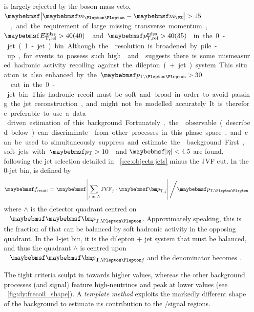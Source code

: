 \DYll is largely rejected by the \PZ boson mass veto, 
\unit{$\mods{\mll - \mZ} > 15$}{\GeV}, and the requirement of large missing transverse 
momentum, \unit{$\metrel > 40 (40)$}{\GeV} and \unit{$\trackmetrel > 40 (35)$}{\GeV} in 
the 0-jet (1-jet) bin. Although the \met resolution is broadened by pile-up, for 
events to possess such high \metrel and \trackmetrel suggests there is some mismeasured 
hadronic activity recoiling against the dilepton (+ jet) system. This situation is also 
enhanced by the \unit{$\ptll > 30$}{\GeV} cut in the 0-jet bin.

This hadronic recoil must be soft and broad in order to avoid passing the jet 
reconstruction, and might not be modelled accurately. It is therefore preferable to use 
a data-driven estimation of this background. Fortunately, the \frecoil observable 
(described below) can discriminate \DYll from other processes in this phase space, and 
can be used to simultaneously suppress and estimate the \DYll background.

First, soft jets with \unit{$\pt > 10$}{\GeV} and $\mods{\eta} < 4.5$ are found, 
following the jet selection detailed in \Section~\ref{sec:objects:jets} minus the JVF 
cut. In the 0-jet bin, \frecoil is defined by
\begin{equation}
	\frecoil = \left. \mods{\sum\limits_{j\text{ in }\wedge} \text{JVF}_{j} \cdot \bvec{p}_{\text{T,}j}} \, \middle/ \ptll \right.
	\label{eq:dy:frecoil}
\end{equation}
where $\wedge$ is the detector quadrant centred on $-\ptllvec$. Approximately speaking, 
this is the fraction of \ptll that can be balanced by soft hadronic activity in the 
opposing quadrant. In the 1-jet bin, it is the dilepton + jet system that must be balanced, 
and thus the quadrant $\wedge$ is centred upon $-\ptlljvec$ and the denominator becomes 
\ptllj.

The tight \met criteria sculpt \frecoil in \DYll towards higher values, whereas the other 
background processes (and signal) feature high-\pt neutrinos and peak at lower values 
(see \Figure~\ref{fig:dy:frecoil_shape}). A \textit{template method} exploits the 
markedly different \frecoil shape of the \DYll background to estimate its contribution to 
the \eech/\mmch signal regions.

